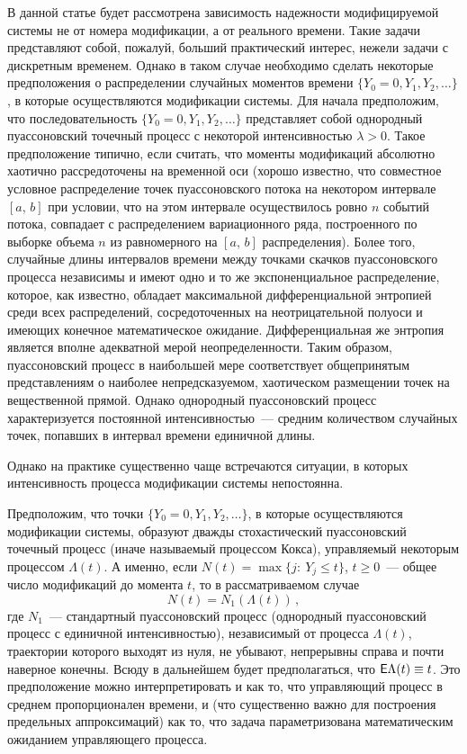 \begin{multicols}{2}
В данной статье будет рассмотрена зависимость надежности
модифицируемой системы не от номера модификации, а от реального
времени. Такие задачи представляют собой, пожалуй, больший
практический интерес, нежели задачи с дискретным временем. Однако
в таком случае необходимо сделать некоторые предположения о
распределении случайных моментов времени
$\{Y_0=0,Y_1,Y_2,\ldots\}$, в которые осуществляются модификации
системы. Для начала предположим, что последовательность
$\{Y_0=0,Y_1,Y_2,\ldots\}$ представляет собой однородный
пуассоновский точечный процесс с некоторой интенсивностью
$\lambda>0$. Такое предположение типично, если считать, что
моменты модификаций абсолютно хаотично рассредоточены на временной
оси (хорошо известно, что совместное условное распределение точек
пуассоновского потока на некотором интервале $[a,\,b]$ при условии,
что на этом интервале осуществилось ровно $n$ событий потока,
совпадает с распределением вариационного ряда, построенного по
выборке объема $n$ из равномерного на $[a,\,b]$ распределения).
Более того, случайные длины интервалов времени между точками
скачков пуассоновского процесса независимы и имеют одно и то же
экспоненциальное распределение, которое, как известно, обладает
максимальной дифференциальной энтропией среди всех распределений,
сосредоточенных на неотрицательной полуоси и имеющих конечное
математическое ожидание. Дифференциальная же энтропия является
вполне адекватной мерой неопределенности. Таким образом,
пуассоновский процесс в наибольшей мере соответствует общепринятым
представлениям о наиболее непредсказуемом, хаотическом размещении
точек на вещественной прямой. Однако однородный пуассоновский
процесс характеризуется постоянной интенсивностью~--- средним
количеством случайных точек, попавших в интервал времени единичной
длины.

Однако на практике существенно чаще встречаются ситуации, в
которых интенсивность процесса модификации системы непостоянна.

Предположим, что точки $\{Y_0=0,Y_1,Y_2,\ldots\}$, в которые
осуществляются модификации системы, образуют дважды стохастический
пуассоновский точечный процесс (иначе называемый процессом Кокса),
управляемый некоторым процессом $\Lambda(t)$. А именно, если
$
N(t)=\max\{j:\ Y_j\le t\}$, $t\ge0$~--- общее
число модификаций до момента $t$, то в рассматриваемом случае
$$
N(t)=N_1(\Lambda(t))\,,
$$
где $N_1$~--- стандартный пуассоновский
процесс (однородный пуассоновский процесс с единичной
интен\-сив\-ностью), независимый от процесса $\Lambda(t)$, траектории
которого выходят из нуля, не убывают, %
непрерывны справа и почти
наверное конечны. Всюду в дальнейшем будет предполагаться, что
${\sf E}\Lambda(t)\equiv t$. Это предположение можно
интерпретировать и как то, что управляющий процесс в среднем
пропорционален времени, и (что существенно важно для построения
предельных аппроксимаций) как то, что задача параметризована
математическим ожиданием управляющего процесса.


\end{multicols}
